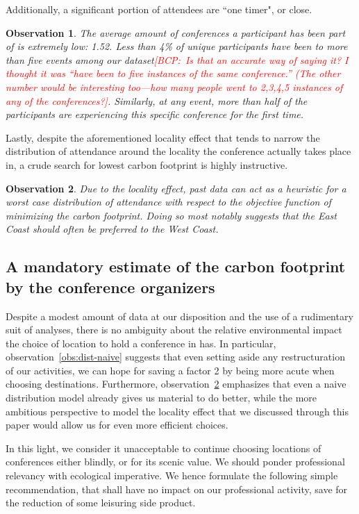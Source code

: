 \documentclass{scrartcl}
\newcommand{\bcp}[1]{\textcolor{red}{{[BCP:~#1]}}}
\newcommand{\bcp}[1]{}
\newcommand{\event}{event} %
\newtheorem{obs}{Observation}
\begin{document}
Additionally, a significant portion of attendees are ``one timer", or close.

\begin{obs}
  The average amount of conferences a participant has been part of is extremely low: 1.52.
  Less than 4\% of unique participants have been to more than five events
  among our dataset\bcp{Is that an accurate way of saying it?  I thought it
    was ``have been to five instances of the same conference.''  (The other
    number would be interesting too---how many people went to 2,3,4,5
    instances of {\em any} of the conferences?}.
  Similarly, at any \event, more than half of the participants are experiencing this specific
  conference for the first time.
  \label{obs:old-timers}
\end{obs}

Lastly, despite the aforementioned locality effect that tends to narrow the
distribution of attendance around the locality the conference actually takes
place in, a crude search for lowest carbon footprint is highly instructive.

\begin{obs}
  Due to the locality effect, past data can act as a heuristic for a worst case
  distribution of attendance with respect to the objective function of
  minimizing the carbon footprint. Doing so most notably suggests that the East
  Coast should often be preferred to the West Coast.
  \label{obs:optim}
\end{obs}

\subsection{A mandatory estimate of the carbon footprint by the conference organizers}

Despite a modest amount of data at our disposition and the use of a rudimentary suit of
analyses, there is no ambiguity about the relative environmental impact the choice of
location to hold a conference in has. In particular, observation~\ref{obs:dist-naive}
suggests that even setting aside any restructuration of our activities, we can hope for
saving a factor 2 by being more acute when choosing destinations. Furthermore,
observation~\ref{obs:optim} emphasizes that even a naive distribution model already gives
us material to do better, while the more ambitious perspective to model the locality effect
that we discussed through this paper would allow us for even more efficient choices.

In this light, we consider it unacceptable to continue choosing locations of conferences
either blindly, or for its scenic value. We should ponder professional relevancy with
ecological imperative. We hence formulate the following simple recommendation, that shall
have no impact on our professional activity, save for the reduction of some leisuring side
product.
\end{document}
